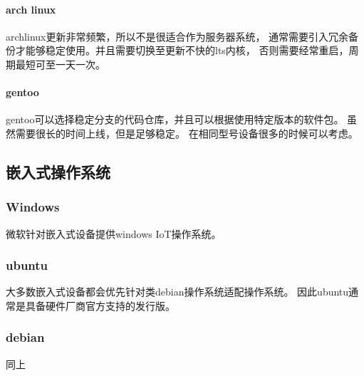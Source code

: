 \paragraph{arch linux}
archlinux更新非常频繁，所以不是很适合作为服务器系统，
通常需要引入冗余备份才能够稳定使用。并且需要切换至更新不快的lts内核，
否则需要经常重启，周期最短可至一天一次。

\paragraph{gentoo}
gentoo可以选择稳定分支的代码仓库，并且可以根据使用特定版本的软件包。
虽然需要很长的时间上线，但是足够稳定。
在相同型号设备很多的时候可以考虑。

\subsection{嵌入式操作系统}

\subsubsection{Windows}
微软针对嵌入式设备提供windows IoT操作系统。

\subsubsection{ubuntu}
大多数嵌入式设备都会优先针对类debian操作系统适配操作系统。
因此ubuntu通常是具备硬件厂商官方支持的发行版。

\subsubsection{debian}
同上